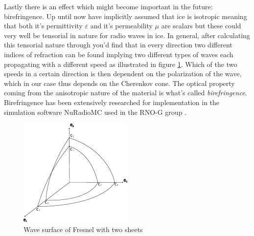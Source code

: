 \documentclass[11pt,a4paper,faculty=we,language=en,doctype=report]{cls/ugent-doc}
\begin{document}
Lastly there is an effect which might become important in the future:
birefringence.  Up until now have implicitly assumed that ice is isotropic
meaning that both it's permittivity $\varepsilon$ and it's permeability $\mu$
are scalars but these could very well be tensorial in nature for radio waves in
ice. In general, after calculating this tensorial nature through you'd find
that in every direction two different indices of refraction can be found
implying two different types of waves each propagating with a different speed
as illustrated in figure \ref{fig:Fresnel}. Which of the two speeds in a
certain direction is then dependent on the polarization of the wave, which in
our case thus depends on the Cherenkov cone. The optical property coming from
the anisotropic nature of the material is what's called \textit{birefringence}.
Birefringence has been extensively researched for implementation in the
simulation software NuRadioMC used in the RNO-G group \cite{Heyer2023}.
\begin{figure}
  \centering
  \includegraphics[width=0.5\textwidth]{figures/Fresnel.pdf}
  \caption{Wave surface of Fresnel with two sheets}
  \label{fig:Fresnel}
\end{figure}
\end{document}
